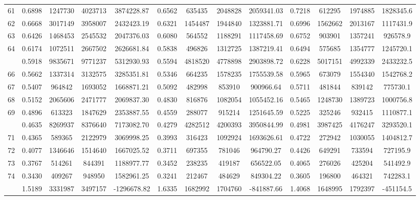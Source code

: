 \documentclass[
  12pt,
]{article}
\begin{document}
\begin{longtable}[t]{lcccccccccccc}
61 & 0.6898 & 1247730 & 4023713 & 3874228.87 & 0.6562 & 635435 & 2048828 & 2059341.03 & 0.7218 & 612295 & 1974885 & 1828345.6\\
62 & 0.6668 & 3017149 & 3958007 & 2432423.19 & 0.6321 & 1454487 & 1944840 & 1323881.71 & 0.6996 & 1562662 & 2013167 & 1117431.9\\
63 & 0.6426 & 1468453 & 2545532 & 2047376.03 & 0.6080 & 564552 & 1188291 & 1117458.69 & 0.6752 & 903901 & 1357241 & 926578.9\\
64 & 0.6174 & 1072511 & 2667502 & 2626681.84 & 0.5838 & 496826 & 1312725 & 1387219.41 & 0.6494 & 575685 & 1354777 & 1245720.1\\
\addlinespace
65 & 0.5918 & 9835671 & 9771237 & 5312930.93 & 0.5594 & 4818520 & 4778898 & 2903898.72 & 0.6228 & 5017151 & 4992339 & 2433232.5\\
66 & 0.5662 & 1337314 & 3132575 & 3285351.81 & 0.5346 & 664235 & 1578235 & 1755539.58 & 0.5965 & 673079 & 1554340 & 1542768.2\\
67 & 0.5407 & 964842 & 1693052 & 1668871.21 & 0.5092 & 482998 & 853910 & 900966.64 & 0.5711 & 481844 & 839142 & 775730.1\\
68 & 0.5152 & 2065606 & 2471777 & 2069837.30 & 0.4830 & 816876 & 1082054 & 1055452.16 & 0.5465 & 1248730 & 1389723 & 1000756.8\\
69 & 0.4896 & 613323 & 1847629 & 2353887.55 & 0.4559 & 288077 & 915214 & 1251645.59 & 0.5225 & 325246 & 932415 & 1110877.1\\
\addlinespace
70 & 0.4635 & 8269937 & 8376640 & 7173082.70 & 0.4279 & 4282512 & 4200393 & 3950844.99 & 0.4981 & 3987425 & 4176247 & 3293520.1\\
71 & 0.4365 & 589365 & 2122979 & 3069998.25 & 0.3993 & 316423 & 1092924 & 1693626.61 & 0.4722 & 272942 & 1030055 & 1404812.7\\
72 & 0.4077 & 1346646 & 1514640 & 1667025.52 & 0.3711 & 697355 & 781046 & 964790.27 & 0.4426 & 649291 & 733594 & 727195.9\\
73 & 0.3767 & 514261 & 844391 & 1188977.77 & 0.3452 & 238235 & 419187 & 656522.05 & 0.4065 & 276026 & 425204 & 541492.9\\
74 & 0.3430 & 409267 & 948950 & 1582961.25 & 0.3241 & 212467 & 484629 & 849304.22 & 0.3605 & 196800 & 464321 & 742283.1\\
\addlinespace
75 & 1.5189 & 3331987 & 3497157 & -1296678.82 & 1.6335 & 1682992 & 1704760 & -841887.66 & 1.4068 & 1648995 & 1792397 & -451154.5\\*
\end{longtable}
\endgroup{}
\end{document}
